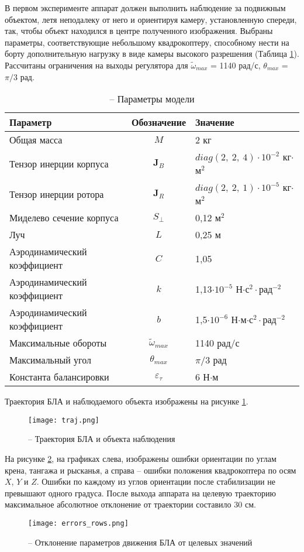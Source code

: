 В первом эксперименте аппарат должен выполнить наблюдение за подвижным объектом, летя неподалеку от него и ориентируя камеру, установленную спереди, так, чтобы объект находился в центре полученного изображения. Выбраны параметры, соответствующие небольшому квадрокоптеру, способному нести на борту дополнительную нагрузку в виде камеры высокого разрешения (Таблица \ref{tb:params_table}).
Рассчитаны ограничения на выходы регулятора
для 
$\tilde \omega_{max}$ = 1140 рад/с,
$\theta_{max}$ = ${\pi}/{3}$ рад.
\begin{table}[h!]
	\centering
	\caption{ -- Параметры модели}\label{tb:params_table} 
	\begin{tabular}{lcl}
		\hline
		Параметр & Обозначение & Значение  \\\hline
		Общая масса & $M$ & 2 кг  \\
		Тензор инерции корпуса & $\bm J_B$ & $diag(2,\ 2,\ 4)\cdot{10^{-2}}$ кг$\cdot$м$^2$  \\
		Тензор инерции ротора & $\bm J_R$ & $diag(2,\ 2,\ 1)\cdot{10^{-5}}$ кг$\cdot$м$^2$  \\
		Миделево сечение корпуса & $S_{\perp}$ & 0,12 м$^2$ \\
		Луч & $L$ & 0,25 м \\
		Аэродинамический коэффициент & $C$ & 1,05\\
		Аэродинамический коэффициент & $k$ & 1,13$\cdot 10^{-5}$ Н$\cdot$с$^2\cdot$рад$^{-2}$ \\		
		Аэродинамический коэффициент & $b$ & 1,5$\cdot 10^{-6}$ Н$\cdot$м$\cdot$с$^2\cdot$рад$^{-2}$ \\		
		Максимальные обороты & $\tilde \omega_{max}$ & 1140 рад/с \\		
		Максимальный угол & $\theta_{max}$ & ${\pi}/{3}$ рад \\
		Константа балансировки & $\varepsilon_\tau$ &6 Н$\cdot$м \\
		\hline
	\end{tabular}
\end{table}
Траектория БЛА и наблюдаемого объекта изображены на рисунке \ref{fig:mau_traj}.
\begin{figure}[H]
	\centering
	\texttt{[image: traj.png]}
	\caption{ -- Траектория БЛА и объекта наблюдения}
	\label{fig:mau_traj}
\end{figure}

На рисунке \ref{fig:mau_errors}, на графиках слева, изображены ошибки ориентации по углам крена, тангажа и рысканья,
а справа -- ошибки положения  квадрокоптера по осям $X$, $Y$ и $Z$.
Ошибки по каждому из углов ориентации после стабилизации не превышают одного градуса.
После выхода аппарата на целевую траекторию максимальное абсолютное отклонение от траектории составило 30 см.
\begin{figure}[H]
	\centering
	\texttt{[image: errors\_rows.png]}
	\caption{ -- Отклонение параметров движения БЛА от целевых значений}
	\label{fig:mau_errors}
\end{figure}

